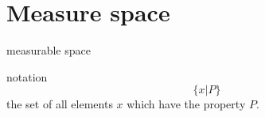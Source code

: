 
\section{Measure space}


\begin{mydef}
    measurable space

    notation 
    \begin{equation}
        \label{eq:11.41}
        \{x |P\} 
    \end{equation}
    the set of all elements $x$ which have the property $P$.
\end{mydef}